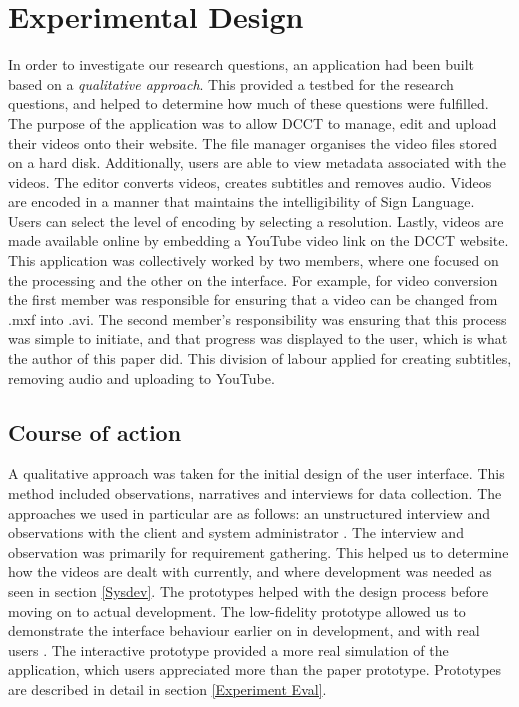 \documentclass{sig-alternate-05-2015}
\begin{document}
\section{Experimental Design}
In order to investigate our research questions, an application had been built based on a \textit{qualitative approach}. This provided a testbed for the research questions, and helped to determine how much of these questions were fulfilled. The purpose of the application was to allow DCCT to manage, edit and upload their videos onto their website. The file manager organises the video files stored on a hard disk. Additionally, users are able to view metadata associated with the videos. The editor converts videos, creates subtitles and removes audio. Videos are encoded in a manner that maintains the intelligibility of Sign Language. Users can select the level of encoding by selecting a resolution. Lastly, videos are made available online by embedding a YouTube video link on the DCCT website.\\
    
This application was collectively worked by two members, where one focused on the processing and the other on the interface. For example, for video conversion the first member was responsible for ensuring that a video can be changed from .mxf into .avi. The second member's responsibility was ensuring that this process was simple to initiate, and that progress was displayed to the user, which is what the author of this paper did. This division of labour applied for creating subtitles, removing audio and uploading to YouTube.

\subsection{Course of action}
A qualitative approach was taken for the initial design of the user interface. This method included observations, narratives and interviews for data collection. The approaches we used in particular are as follows: an unstructured interview \cite{courage2005understanding} and observations with the client and system administrator \cite{iacono2009research}. The interview and observation was primarily for requirement gathering. This helped us to determine how the videos are dealt with currently, and where development was needed as seen in section \ref{Sysdev}. The prototypes helped with the design process before moving on to actual development. The low-fidelity prototype allowed us to demonstrate the interface behaviour earlier on in development, and with real users \cite{rettig1994prototyping}. The interactive prototype provided a more real simulation of the application, which users appreciated more than the paper prototype. Prototypes are described in detail in section \ref{Experiment Eval}.
\end{document}
